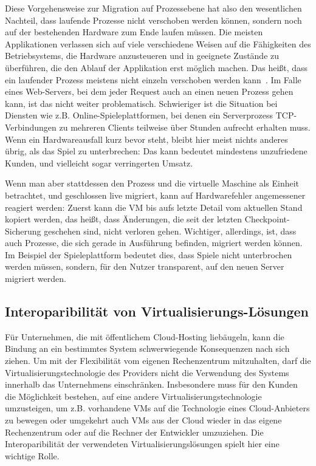 Diese Vorgehensweise zur Migration auf Prozessebene hat also den
wesentlichen Nachteil, dass laufende Prozesse nicht verschoben werden
können, sondern noch auf der bestehenden Hardware zum Ende laufen
müssen. Die meisten Applikationen verlassen sich auf viele
verschiedene Weisen auf die Fähigkeiten des Betriebsystems, die
Hardware anzusteueren und in geeignete Zustände zu überführen, die den
Ablauf der Applikation erst möglich machen. Das heißt, dass ein
laufender Prozess meistens nicht einzeln verschoben werden
kann~\cite{hansen2002nomadic}. Im Falle eines Web-Servers, bei dem
jeder Request auch an einen neuen Prozess gehen kann, ist das nicht
weiter problematisch. Schwieriger ist die Situation bei Diensten wie
z.B. Online-Spieleplattformen, bei denen ein Serverprozess
TCP-Verbindungen zu mehreren Clients teilweise über Stunden aufrecht
erhalten muss. Wenn ein Hardwareausfall kurz bevor steht, bleibt hier
meist nichts anderes übrig, als das Spiel zu unterbrechen: Das kann
bedeutet mindestens unzufriedene Kunden, und vielleicht sogar
verringerten Umsatz.

Wenn man aber stattdessen den Prozess und die virtuelle Maschine als
Einheit betrachtet, und geschlossen live migriert, kann auf
Hardwarefehler angemessener reagiert werden: Zuerst kann die VM bis
aufs letzte Detail vom aktuellen Stand kopiert werden, das heißt, dass
Änderungen, die seit der letzten Checkpoint-Sicherung geschehen sind,
nicht verloren gehen. Wichtiger, allerdings, ist, dass auch Prozesse,
die sich gerade in Ausführung befinden, migriert werden können. Im
Beispiel der Spieleplattform bedeutet dies, dass Spiele nicht
unterbrochen werden müssen, sondern, für den Nutzer transparent, auf
den neuen Server migriert werden.

\subsection{Interoparibilität von Virtualisierungs-Lösungen}
Für Unternehmen, die mit öffentlichem Cloud-Hosting liebäugeln, kann
die Bindung an ein bestimmtes System schwerwiegende Konsequenzen nach
sich ziehen. Um mit der Flexibilität vom eigenen Rechenzentrum
mitzuhalten, darf die Virtualisierungstechnologie des Providers nicht
die Verwendung des Systems innerhalb das Unternehmens
einschränken. Insbesondere muss für den Kunden die Möglichkeit
bestehen, auf eine andere Virtualisierungstechnologie umzusteigen, um
z.B. vorhandene VMs auf die Technologie eines Cloud-Anbieters zu
bewegen oder umgekehrt auch VMs aus der Cloud wieder in das eigene
Rechenzentrum oder auf die Rechner der Entwickler umzuziehen. Die
Interoparibilität der verwendeten Virtualisierungslösungen spielt hier
eine wichtige Rolle.

